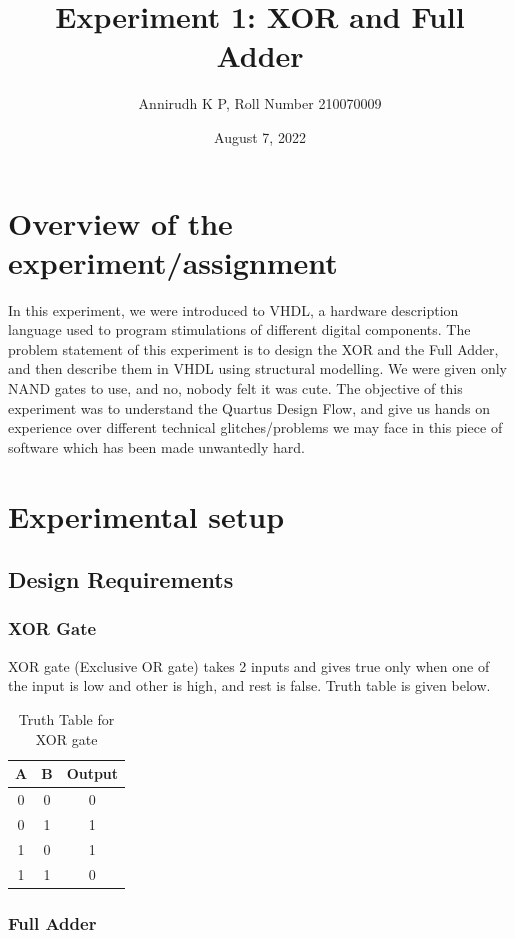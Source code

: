 \documentclass[12pt]{article}
\title{Experiment 1: XOR and Full Adder}
\author{Annirudh K P, Roll Number 210070009}
\date{August 7, 2022}
\begin{document}
\maketitle

\section{Overview of the experiment/assignment}

In this experiment, we were introduced to VHDL, a hardware description language used to program stimulations of different digital components. The problem statement of this experiment is to design the XOR and the Full Adder, and then describe them in VHDL using structural modelling. We were given only NAND gates to use, and no, nobody felt it was cute. The objective of this experiment was to understand the Quartus Design Flow, and give us hands on experience over different technical glitches/problems we may face in this piece of software which has been made unwantedly hard.

\section{Experimental setup}

\subsection{Design Requirements}
\subsubsection{XOR Gate}
XOR gate (Exclusive OR gate) takes 2 inputs and gives true only when one of the input is low and other is high, and rest is false. Truth table is given below.

\begin{table}
 \centering
\begin{tabular}{|c  c |c|} 
\hline  
A & B & Output \\
\hline
0 & 0 & 0 \\
0 & 1 & 1 \\
1 & 0 & 1 \\
1 & 1 & 0 \\
\hline
\end{tabular}
\caption{Truth Table for XOR gate}
\end{table}

\subsubsection{Full Adder}
\end{document}
